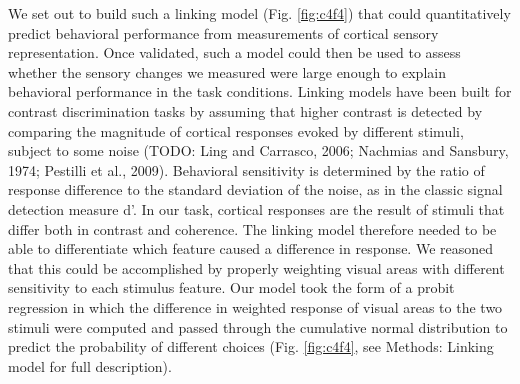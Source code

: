 \documentclass{report}
\begin{document}
We set out to build such a linking model (Fig. \ref{fig:c4f4}) that could quantitatively predict behavioral performance from measurements of cortical sensory representation. Once validated, such a model could then be used to assess whether the sensory changes we measured were large enough to explain behavioral performance in the task conditions. Linking models have been built for contrast discrimination tasks by assuming that higher contrast is detected by comparing the magnitude of cortical responses evoked by different stimuli, subject to some noise \citep{Boynton1999-jd,Foley1981-aw,Gardner2015-bd} (TODO: Ling and Carrasco, 2006; Nachmias and Sansbury, 1974; Pestilli et al., 2009). Behavioral sensitivity is determined by the ratio of response difference to the standard deviation of the noise, as in the classic signal detection measure d’. In our task, cortical responses are the result of stimuli that differ both in contrast and coherence. The linking model therefore needed to be able to differentiate which feature caused a difference in response. We reasoned that this could be accomplished by properly weighting visual areas with different sensitivity to each stimulus feature. Our model took the form of a probit regression \citep{Bliss1934-em} in which the difference in weighted response of visual areas to the two stimuli were computed and passed through the cumulative normal distribution to predict the probability of different choices (Fig. \ref{fig:c4f4}, see Methods: Linking model for full description).
\end{document}
